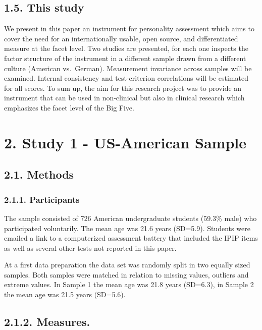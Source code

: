 \documentclass[,man]{apa6}
\theoremstyle{definition}
\theoremstyle{definition}
\theoremstyle{definition}
\theoremstyle{remark}
\begin{document}
\hypertarget{this-study}{%
\subsection{1.5. This study}\label{this-study}}

We present in this paper an instrument for personality assessment which
aims to cover the need for an internationally usable, open source, and
differentiated measure at the facet level. Two studies are presented,
for each one inspects the factor structure of the instrument in a
different sample drawn from a different culture (American vs.~German).
Measurement invariance across samples will be examined. Internal
consistency and test-criterion correlations will be estimated for all
scores. To sum up, the aim for this research project was to provide an
instrument that can be used in non-clinical but also in clinical
research which emphasizes the facet level of the Big Five.

\hypertarget{study-1---us-american-sample}{%
\section{2. Study 1 - US-American
Sample}\label{study-1---us-american-sample}}

\hypertarget{methods}{%
\subsection{2.1. Methods}\label{methods}}

\hypertarget{participants}{%
\subsubsection{2.1.1. Participants}\label{participants}}

The sample consisted of 726 American undergraduate students (59.3\%
male) who participated voluntarily. The mean age was 21.6 years
(SD=5.9). Students were emailed a link to a computerized assessment
battery that included the IPIP items as well as several other tests not
reported in this paper.

At a first data preparation the data set was randomly split in two
equally sized samples. Both samples were matched in relation to missing
values, outliers and extreme values. In Sample 1 the mean age was 21.8
years (SD=6.3), in Sample 2 the mean age was 21.5 years (SD=5.6).

\hypertarget{measures.}{%
\subsection{2.1.2. Measures.}\label{measures.}}
\end{document}
